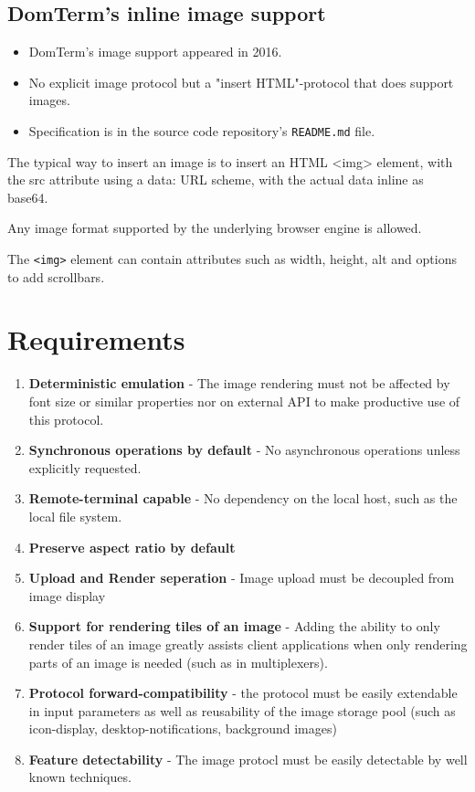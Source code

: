 \documentclass[a4paper]{article}
\begin{document}
\subsection{DomTerm's inline image support}

\begin{itemize}
    \item DomTerm's image support appeared in 2016.
    \item No explicit image protocol but a "insert HTML"-protocol that does support images.
    \item Specification is in the source code repository's \texttt{README.md} file.
\end{itemize}

The typical way to insert an image is to insert an HTML <img> element,
with the src attribute using a data: URL scheme,
with the actual data inline as base64.

Any image format supported by the underlying browser engine is allowed.

The \texttt{<img>} element can contain attributes such as width, height, alt
and options to add scrollbars.
\section{Requirements} %

\begin{enumerate}
    \item \textbf{Deterministic emulation} - The image rendering must not be affected by font size
        or similar properties nor on external API to make productive use of this protocol.
    \item \textbf{Synchronous operations by default} - No asynchronous operations unless explicitly requested.
    \item \textbf{Remote-terminal capable} - No dependency on the local host, such as the local file system.
    \item \textbf{Preserve aspect ratio by default}
    \item \textbf{Upload and Render seperation} - Image upload must be decoupled from image display
    \item \textbf{Support for rendering tiles of an image} - Adding the ability to only render tiles
        of an image greatly assists client applications when only rendering parts of an image is
        needed (such as in multiplexers).
    \item \textbf{Protocol forward-compatibility} - the protocol must be easily extendable in input
        parameters as well as reusability of the image storage pool
        (such as icon-display, desktop-notifications, background images)
    \item \textbf{Feature detectability} - The image protocl must be easily detectable by well known techniques.
\end{enumerate}
\end{document}
